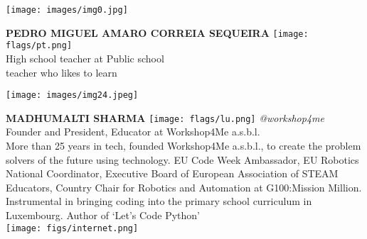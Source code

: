 \noindent
\begin{minipage}{0.3\textwidth}
\centering
\texttt{[image: images/img0.jpg]}
\end{minipage}
\hfill
\begin{minipage}{0.6\textwidth}\raggedright
\color{color1}\uppercase{\textbf{Pedro Miguel Amaro Correia Sequeira}}
\color{color2}\hspace{0.2cm}\texttt{[image: flags/pt.png]}
\\
High school teacher at Public school\\
{\footnotesize  teacher who likes to learn}\\
\end{minipage}
\newline\newline\newline

\noindent
\begin{minipage}{0.3\textwidth}
\centering
\texttt{[image: images/img24.jpeg]}
\end{minipage}
\hfill
\begin{minipage}{0.6\textwidth}\raggedright
\color{color1}\uppercase{\textbf{Madhumalti Sharma}}
\color{color2}\hspace{0.2cm}\texttt{[image: flags/lu.png]}
\hspace{0.2cm}\textit{@workshop4me}
\\
Founder and President, Educator at Workshop4Me a.s.b.l.\\
{\footnotesize More than 25 years in tech, founded Workshop4Me a.s.b.l., to create the problem solvers of the future using technology. EU Code Week Ambassador, EU Robotics National Coordinator, Executive Board of European Association of STEAM Educators, Country Chair for Robotics and Automation at G100:Mission Million. Instrumental in bringing coding into the primary school curriculum in Luxembourg. Author of ‘Let’s Code Python’}\\
\texttt{[image: figs/internet.png]}
\end{minipage}
\newline\newline\newline

